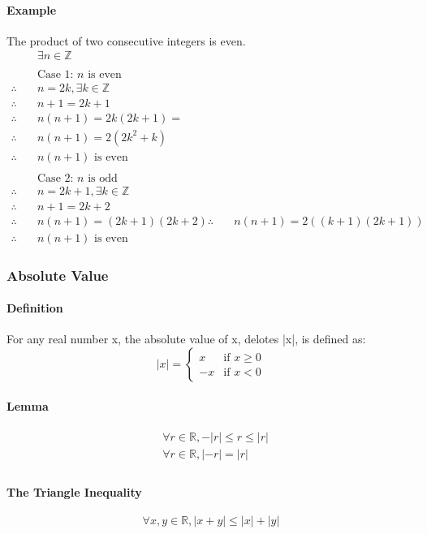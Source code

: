 \paragraph*{Example}
The product of two consecutive integers is even.
\begin{align*}
    & \exists n \in \mathbb{Z}\\
    \\
    & \text{Case 1: } n \text{ is even}\\
    \therefore \quad & n = 2k, \exists k \in \mathbb{Z}\\
    \therefore \quad & n + 1 = 2k + 1\\
    \therefore \quad & n(n+1) = 2k(2k+1) = \\
    \therefore \quad & n(n+1) = 2(2k^2 + k)\\
    \therefore \quad & n(n+1) \text{ is even}\\
    \\
    & \text{Case 2: } n \text{ is odd}\\
    \therefore \quad & n = 2k + 1, \exists k \in \mathbb{Z}\\
    \therefore \quad & n + 1 = 2k + 2\\
    \therefore \quad & n(n+1) = (2k + 1)(2k + 2)
    \therefore \quad & n(n+1) = 2((k + 1)(2k + 1))\\
    \therefore \quad & n(n+1) \text{ is even}
\end{align*}

\subsubsection*{Absolute Value}
\paragraph*{Definition}
For any real number x, the absolute value of x, delotes |x|, is defined as:
\begin{equation*}
    |x| = \begin{cases}
        x & \text{if } x \geq 0\\
        -x & \text{if } x < 0
    \end{cases}
\end{equation*}

\paragraph*{Lemma}
\begin{align*}
    & \forall r \in \mathbb{R}, -|r| \leq r \leq |r|\\
    & \forall r \in \mathbb{R}, |-r| = |r|\\
\end{align*}

\paragraph*{The Triangle Inequality}
\begin{equation*}
    \forall x,y \in \mathbb{R}, |x+y| \leq |x| + |y|
\end{equation*}